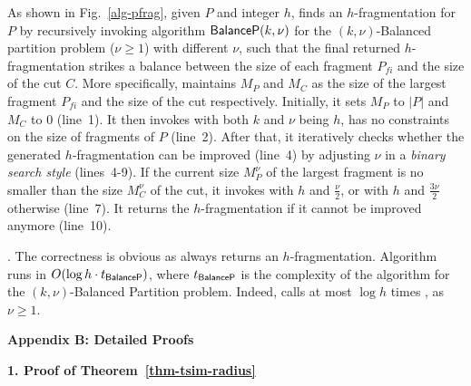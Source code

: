 As shown in Fig.~\ref{alg-pfrag}, given $P$ and integer $h$,
 finds an $h$-fragmentation for $P$ by recursively invoking algorithm ${\mathsf{BalanceP}}(k,\nu)$ for the {\sc $(k,\nu)$-Balanced partition} problem ($\nu\geq 1$) with different $\nu$,
such that the final returned $h$-fragmentation strikes a balance between the size of each fragment ${P}_{fi}$ and the size of the cut $C$.
More specifically,  maintains $M_P$ and $M_C$ as the size of the largest fragment ${P}_{fi}$ and the size of the cut respectively.
Initially, it sets $M_P$ to $|P|$ and $M_C$ to 0 (line~1).
It then invokes  with both $k$ and $\nu$ being $h$, \ie has no constraints on the size of fragments of $P$ (line~2).
After that, it iteratively checks whether the generated $h$-fragmentation can be improved (line~4) by adjusting $\nu$ in a {\em binary search style} (lines~4-9).
If the current size $M^\nu_P$ of the largest fragment is no smaller than the size $M^\nu_C$ of the cut,
it invokes  with $h$ and $\frac{\nu}{2}$, or with $h$ and $\frac{3\nu}{2}$ otherwise (line~7).
It returns the $h$-fragmentation if it cannot be improved anymore (line~10).

\vspace{-1.5ex}
.
The correctness is obvious as  always returns an $h$-fragmentation.
Algorithm~ runs in $O(\log h\cdot t_{{\mathsf{BalanceP}}})$, where $t_{{\mathsf{BalanceP}}}$ is the complexity of the algorithm for the {\sc $(k,\nu)$-Balanced Partition} problem. Indeed,  calls at most $\log h$ times , as $\nu\geq 1$.


\vspace{1ex}
\noindent
{\large \textbf{Appendix B: Detailed Proofs}}
\label{sec-apd-proofs}

\noindent
{\textbf{1. Proof of Theorem~\ref{thm-tsim-radius}}}

